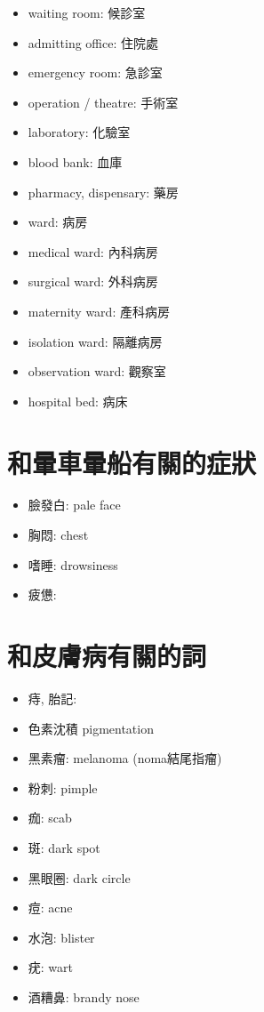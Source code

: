 \begin{multicols}{2}
\begin{itemize}
  \item waiting room: 候診室
  \item admitting office: 住院處
  \item emergency room: 急診室
  \item operation / theatre: 手術室
  \item laboratory: 化驗室
  \item blood bank: 血庫
  \item pharmacy, dispensary: 藥房
  \item ward: 病房
  \item medical ward: 內科病房
  \item surgical ward: 外科病房
  \item maternity ward: 產科病房
  \item isolation ward: 隔離病房
  \item observation ward: 觀察室
  \item hospital bed: 病床
\end{itemize}
\end{multicols}

\section{和暈車暈船有關的症狀}
\begin{itemize}
  \itemsep0em
  \item 臉發白: pale face
  \item 胸悶: chest 
  \item 嗜睡: drowsiness
  \item 疲憊: 
\end{itemize}

\section{和皮膚病有關的詞}
\begin{multicols}{3}
\begin{itemize}
  \itemsep0em
  \item 痔, 胎記: 
  \item 色素沈積 pigmentation
  \item 黑素瘤: melanoma (noma結尾指瘤)
  \item 粉刺: pimple
  \item 痂: scab
  \item 斑: dark spot
  \item 黑眼圈: dark circle
  \item 痘: acne
  \item 水泡: blister
  \item 疣: wart
  \item 酒糟鼻: brandy nose
\end{itemize}
\end{multicols}

